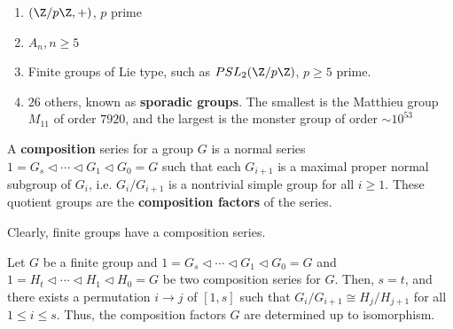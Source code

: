 \begin{thm}
    \begin{enumerate}
        \item $(\Z/p\Z,+)$, $p$ prime
        \item $A_n,n \geq 5$
        \item Finite groups of Lie type, such as $PSL_2(\Z/p\Z)$, $p\geq 5$ prime.
        \item $26$ others, known as \textbf{sporadic groups}. The smallest is the Matthieu group $M_{11}$ of order $7920$, and the largest is the monster group of order $\sim 10^{53}$
    \end{enumerate}
\end{thm}

\begin{defn}
    A \textbf{composition} series for a group $G$ is a normal series $1 = G_s \lhd\cdots \lhd G_1 \lhd G_0=G$ such that each $G_{i+1}$ is a maximal proper normal subgroup of $G_i$, i.e. $G_{i}/G_{i+1}$ is a nontrivial simple group for all $i \geq 1$. These quotient groups are the \textbf{composition factors} of the series.
\end{defn}

\begin{rmk}
    Clearly, finite groups have a composition series.
\end{rmk}

\begin{thm}
    Let $G$ be a finite group and $1=G_s \lhd \cdots \lhd G_1 \lhd G_0 = G$ and $1=H_t \lhd \cdots \lhd H_1 \lhd H_0 = G$ be two composition series for $G$. Then, $s=t$, and there exists a permutation $i \to j$ of $[1,s]$ such that $G_i/G_{i+1} \cong H_j/H_{j+1}$ for all $1 \leq i \leq s$. Thus, the composition factors $G$ are determined up to isomorphism.
\end{thm}

